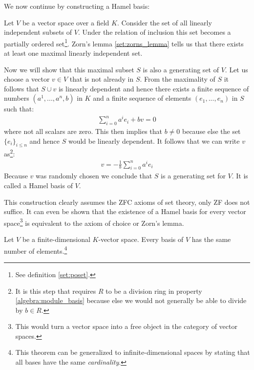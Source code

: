     We now continue by constructing a Hamel basis:
    \begin{construct}\label{linalgebra:hamel_basis}
        Let $V$ be a vector space over a field $K$. Consider the set of all linearly independent subsets of $V$. Under the relation of inclusion this set becomes a partially ordered set\footnote{See definition \ref{set:poset}.}. Zorn's lemma \ref{set:zorns_lemma} tells us that there exists at least one maximal linearly independent set.

        Now we will show that this maximal subset $S$ is also a generating set of $V$. Let us choose a vector $v\in V$ that is not already in $S$. From the maximality of $S$ it follows that $S\cup v$ is linearly dependent and hence there exists a finite sequence of numbers $(a^1, ..., a^n, b)$ in $K$ and a finite sequence of elements $(e_1, ..., e_n)$ in $S$ such that:
        \begin{gather}
            \sum_{i=0}^n a^ie_i + bv = 0
        \end{gather}
        where not all scalars are zero. This then implies that $b\neq0$ because else the set $\{e_i\}_{i\leq n}$ and hence $S$ would be linearly dependent. It follows that we can write $v$ as\footnote{It is this step that requires $R$ to be a division ring in property \ref{algebra:module_basis} because else we would not generally be able to divide by $b\in R$.}:
        \begin{gather}
            v = -\frac{1}{b}\sum_{i=0}^na^ie_i
        \end{gather}
        Because $v$ was randomly chosen we conclude that $S$ is a generating set for $V$. It is called a Hamel basis of $V$.
    \end{construct}
    \begin{remark}
        This construction clearly assumes the ZFC axioms of set theory, only ZF does not suffice. It can even be shown that the existence of a Hamel basis for every vector space\footnote{This would turn a vector space into a free object in the category of vector spaces.} is equivalent to the axiom of choice or Zorn's lemma.
    \end{remark}

        \begin{property}
        Let $V$ be a finite-dimensional $K$-vector space. Every basis of $V$ has the same number of elements.\footnote{This theorem can be generalized to infinite-dimensional spaces by stating that all bases have the same \textit{cardinality}.}
    \end{property}

